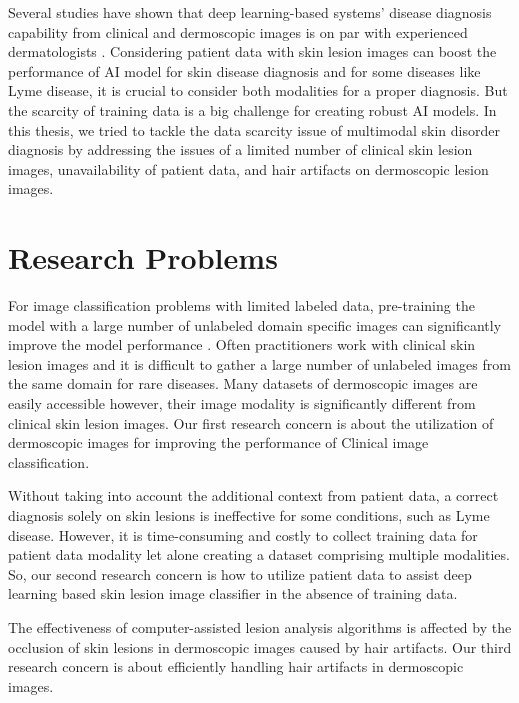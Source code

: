 Several studies have shown that deep learning-based systems’ disease diagnosis capability from clinical and dermoscopic images is on par with experienced dermatologists \cite{Codella2019, Brinker2019, Maron2019, Tschandl2018, Esteva2017, Han2018}. Considering patient data with skin lesion images can boost the performance of AI model for skin disease diagnosis and for some diseases like Lyme disease, it is crucial to consider both modalities for a proper diagnosis. But the scarcity of training data is a big challenge for creating robust AI models. In this thesis, we tried to tackle the data scarcity issue of multimodal skin disorder diagnosis by addressing the issues of a limited number of clinical skin lesion images, unavailability of patient data, and hair artifacts on dermoscopic lesion images.

\section{Research Problems}
For image classification problems with limited labeled data, pre-training the model with a large number of unlabeled domain specific images can significantly improve the model performance \cite{9710396, He2020.04.13.20063941, 9010639, 10.1007/978-3-030-59710-8_39, https://doi.org/10.48550/arxiv.2211.08559, https://doi.org/10.48550/arxiv.2010.05352}. Often practitioners work with clinical skin lesion images and it is difficult to gather a large number of unlabeled images from the same domain for rare diseases. Many datasets of dermoscopic images are easily accessible however, their image modality is significantly different from clinical skin lesion images. Our first research concern is about the utilization of dermoscopic images for improving the performance of Clinical image classification. 

Without taking into account the additional context from patient data, a correct diagnosis solely on skin lesions is ineffective for some conditions, such as Lyme disease. However, it is time-consuming and costly to collect training data for patient data modality let alone creating a dataset comprising multiple modalities. So, our second research concern is how to utilize patient data to assist deep learning based skin lesion image classifier in the absence of training data.

The effectiveness of computer-assisted lesion analysis algorithms is affected by the occlusion of skin lesions in dermoscopic images caused by hair artifacts. Our third research concern is about efficiently handling hair artifacts in dermoscopic images.

